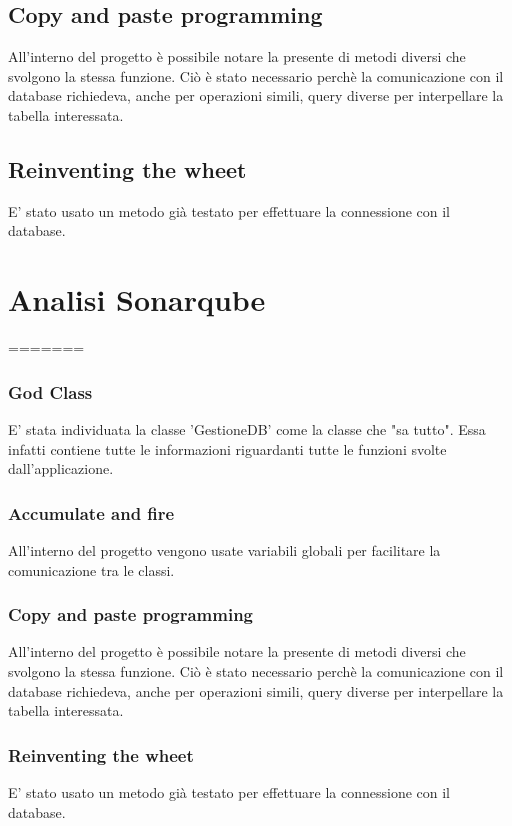 \documentclass[a4paper, titlepage]{article}
\begin{document}
\subsection{Copy and paste programming}
All’interno del progetto è possibile notare la presente di metodi diversi che svolgono la stessa funzione. Ciò è stato necessario perchè la comunicazione con il database richiedeva, anche per operazioni simili, query diverse per interpellare la tabella interessata.
\subsection{Reinventing the wheet}
E' stato usato un metodo già testato per effettuare la connessione con il database.

\section{Analisi Sonarqube}
=======
\subsubsection{God Class}
E' stata individuata la classe 'GestioneDB' come la classe che "sa tutto". Essa infatti contiene tutte le informazioni riguardanti tutte le funzioni svolte dall'applicazione.
\subsubsection{Accumulate and fire}
All'interno del progetto vengono usate variabili globali per facilitare la comunicazione tra le classi.
\subsubsection{Copy and paste programming}
All’interno del progetto è possibile notare la presente di metodi diversi che svolgono la stessa funzione. Ciò è stato necessario perchè la comunicazione con il database richiedeva, anche per operazioni simili, query diverse per interpellare la tabella interessata.
\subsubsection{Reinventing the wheet}
E' stato usato un metodo già testato per effettuare la connessione con il database.
\end{document}
